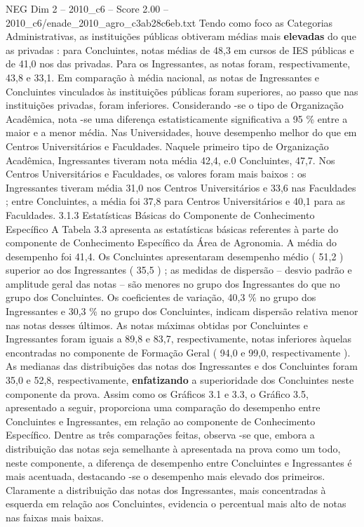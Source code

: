 \begin{textsample}{NEG Dim 2 – 2010\_c6 – Score 2.00 – 2010\_c6/enade\_2010\_agro\_c3ab28c6eb.txt}
Tendo como foco as Categorias Administrativas, as instituições públicas obtiveram médias mais \textbf{elevadas} do que as privadas : para Concluintes, notas médias de 48,3 em cursos de IES públicas e de 41,0 nos das privadas.
Para os Ingressantes, as notas foram, respectivamente, 43,8 e 33,1.
Em comparação à média nacional, as notas de Ingressantes e Concluintes vinculados às instituições públicas foram superiores, ao passo que nas instituições privadas, foram inferiores.
Considerando -se o tipo de Organização Acadêmica, nota -se uma diferença estatisticamente significativa a 95 \% entre a maior e a menor média.
Nas Universidades, houve desempenho melhor do que em Centros Universitários e Faculdades.
Naquele primeiro tipo de Organização Acadêmica, Ingressantes tiveram nota média 42,4, e.0 Concluintes, 47,7.
Nos Centros Universitários e Faculdades, os valores foram mais baixos : os Ingressantes tiveram média 31,0 nos Centros Universitários e 33,6 nas Faculdades ; entre Concluintes, a média foi 37,8 para Centros Universitários e 40,1 para as Faculdades. 3.1.3 Estatísticas Básicas do Componente de Conhecimento Específico A Tabela 3.3 apresenta as estatísticas básicas referentes à parte do componente de Conhecimento Específico da Área de Agronomia.
A média do desempenho foi 41,4.
Os Concluintes apresentaram desempenho médio ( 51,2 ) superior ao dos Ingressantes ( 35,5 ) ; as medidas de dispersão – desvio padrão e amplitude geral das notas – são menores no grupo dos Ingressantes do que no grupo dos Concluintes.
Os coeficientes de variação, 40,3 \% no grupo dos Ingressantes e 30,3 \% no grupo dos Concluintes, indicam dispersão relativa menor nas notas desses últimos.
As notas máximas obtidas por Concluintes e Ingressantes foram iguais a 89,8 e 83,7, respectivamente, notas inferiores àquelas encontradas no componente de Formação Geral ( 94,0 e 99,0, respectivamente ).
As medianas das distribuições das notas dos Ingressantes e dos Concluintes foram 35,0 e 52,8, respectivamente, \textbf{enfatizando} a superioridade dos Concluintes neste componente da prova.
Assim como os Gráficos 3.1 e 3.3, o Gráfico 3.5, apresentado a seguir, proporciona uma comparação do desempenho entre Concluintes e Ingressantes, em relação ao componente de Conhecimento Específico.
Dentre as três comparações feitas, observa -se que, embora a distribuição das notas seja semelhante à apresentada na prova como um todo, neste componente, a diferença de desempenho entre Concluintes e Ingressantes é mais acentuada, destacando -se o desempenho mais elevado dos primeiros.
Claramente a distribuição das notas dos Ingressantes, mais concentradas à esquerda em relação aos Concluintes, evidencia o percentual mais alto de notas nas faixas mais baixas.

\end{textsample}
